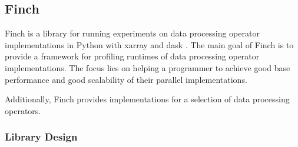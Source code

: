 \subsection{Finch}

Finch is a library for running experiments on data processing operator implementations in Python with xarray \cite{hoyer2017xarray} and dask \cite{rocklin2015dask}.
The main goal of Finch is to provide a framework for profiling runtimes of data processing operator implementations.
The focus lies on helping a programmer to achieve good base performance and good scalability of their parallel implementations.

Additionally, Finch provides implementations for a selection of data processing operators.

\subsubsection{Library Design}
